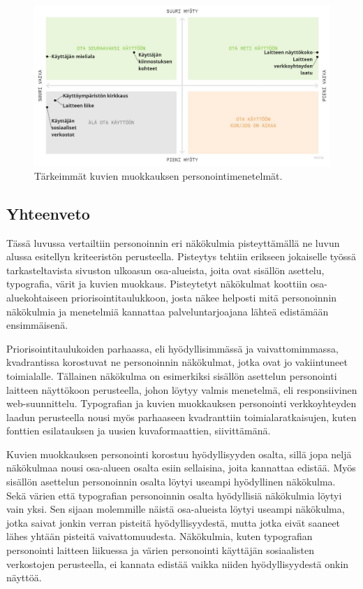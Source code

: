 \documentclass[finnish, 12pt, a4paper, elec, utf8, a-1b, online]{aaltothesis}
\begin{document}
\begin{figure}[htb]
    \centering
    \includegraphics[width=\textwidth]{images/images-priorization.pdf}
    \caption{Tärkeimmät kuvien muokkauksen personointimenetelmät.~\label{fig:images-priorization}}
\end{figure}

\subsection{Yhteenveto}

Tässä luvussa vertailtiin personoinnin eri näkökulmia pisteyttämällä ne luvun
alussa esitellyn kriteeristön perusteella. Pisteytys tehtiin erikseen jokaiselle
työssä tarkasteltavista sivuston ulkoasun osa-alueista, joita ovat sisällön
asettelu, typografia, värit ja kuvien muokkaus. Pisteytetyt näkökulmat koottiin
osa-aluekohtaiseen priorisointitaulukkoon, josta näkee helposti mitä
personoinnin näkökulmia ja menetelmiä kannattaa palveluntarjoajana lähteä
edistämään ensimmäisenä.

Priorisointitaulukoiden parhaassa, eli hyödyllisimmässä ja vaivattomimmassa,
kvadrantissa korostuvat ne personoinnin näkökulmat, jotka ovat jo vakiintuneet
toimialalle. Tällainen näkökulma on esimerkiksi sisällön asettelun personointi
laitteen näyttökoon perusteella, johon löytyy valmis menetelmä, eli
responsiivinen web-suunnittelu. Typografian ja kuvien muokkauksen personointi
verkkoyhteyden laadun perusteella nousi myös parhaaseen kvadranttiin
toimialaratkaisujen, kuten fonttien esilatauksen ja uusien kuvaformaattien,
siivittämänä.

Kuvien muokkauksen personointi korostuu hyödyllisyyden osalta, sillä jopa neljä
näkökulmaa nousi osa-alueen osalta esiin sellaisina, joita kannattaa edistää.
Myös sisällön asettelun personoinnin osalta löytyi useampi hyödyllinen
näkökulma. Sekä värien että typografian personoinnin osalta hyödyllisiä
näkökulmia löytyi vain yksi. Sen sijaan molemmille näistä osa-alueista löytyi
useampi näkökulma, jotka saivat jonkin verran pisteitä hyödyllisyydestä, mutta
jotka eivät saaneet lähes yhtään pisteitä vaivattomuudesta. Näkökulmia, kuten
typografian personointi laitteen liikuessa ja värien personointi käyttäjän
sosiaalisten verkostojen perusteella, ei kannata edistää vaikka niiden
hyödyllisyydestä onkin näyttöä.
\end{document}
